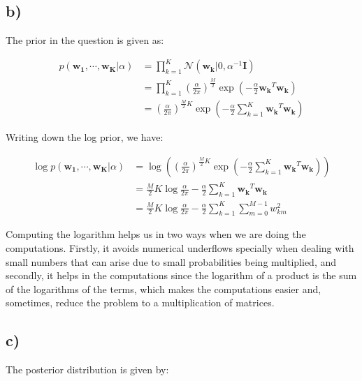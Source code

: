 \documentclass[12pt,a4paper,oneside]{paper}
\begin{document}
\newpage
\subsection*{b)}

The prior in the question is given as: 

\begin{align*}
    p(\bm{w_1}, \cdots, \bm{w_K} | \alpha) &= \prod_{k=1}^{K} \mathcal{N}(\bm{w_k} | 0, \alpha^{-1} \bm{I}) \\
    &= \prod_{k=1}^{K} \left(\frac{\alpha}{2\pi}\right)^{\frac{M}{2}} \exp\left(-\frac{\alpha}{2} \bm{w_k}^T \bm{w_k}\right) \\
    &= \left(\frac{\alpha}{2\pi}\right)^{\frac{M}{2} K} \exp\left(-\frac{\alpha}{2} \sum_{k=1}^{K} \bm{w_k}^T \bm{w_k}\right)
\end{align*}

Writing down the log prior, we have:

\begin{align*}
    \log p(\bm{w_1}, \cdots, \bm{w_K} | \alpha) &= \log \left( \left(\frac{\alpha}{2\pi}\right)^{\frac{M}{2} K} \exp\left(-\frac{\alpha}{2} \sum_{k=1}^{K} \bm{w_k}^T \bm{w_k}\right)\right) \\
    &= \frac{M}{2} K \log \frac{\alpha}{2\pi} - \frac{\alpha}{2} \sum_{k=1}^{K} \bm{w_k}^T \bm{w_k} \\
    &= \frac{M}{2} K \log \frac{\alpha}{2\pi} - \frac{\alpha}{2} \sum_{k=1}^{K} \sum_{m=0}^{M - 1} w_{km}^2
\end{align*}

Computing the logarithm helps us in two ways when we are doing the computations. Firstly, it avoids numerical
underflows specially when dealing with small numbers that can arise due to small probabilities being multiplied, and secondly,
it helps in the computations since the logarithm of a product is the sum of the logarithms of the terms, which makes
the computations easier and, sometimes, reduce the problem to a multiplication of matrices.

\newpage
\subsection*{c)}

The posterior distribution is given by:
\end{document}
